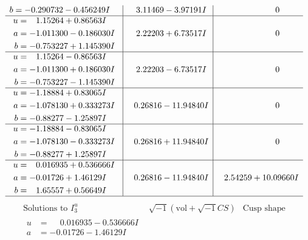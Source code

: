 \documentclass[1p]{elsarticle_modified}
\theoremstyle{definition}
\newcommand{\I}{\sqrt{-1}}
\begin{document}
$$\begin{array}{c|c|c}
\begin{aligned}
b &= -0.290732 - 0.456249 I\end{aligned}
 & \phantom{-}3.11469 - 3.97191 I & \phantom{-0.000000 } 0 \\ \hline\begin{aligned}
u &= \phantom{-}1.15264 + 0.86563 I \\
a &= -1.011300 - 0.186030 I \\
b &= -0.753227 + 1.145390 I\end{aligned}
 & \phantom{-}2.22203 + 6.73517 I & \phantom{-0.000000 } 0 \\ \hline\begin{aligned}
u &= \phantom{-}1.15264 - 0.86563 I \\
a &= -1.011300 + 0.186030 I \\
b &= -0.753227 - 1.145390 I\end{aligned}
 & \phantom{-}2.22203 - 6.73517 I & \phantom{-0.000000 } 0 \\ \hline\begin{aligned}
u &= -1.18884 + 0.83065 I \\
a &= -1.078130 + 0.333273 I \\
b &= -0.88277 - 1.25897 I\end{aligned}
 & \phantom{-}0.26816 - 11.94840 I & \phantom{-0.000000 } 0 \\ \hline\begin{aligned}
u &= -1.18884 - 0.83065 I \\
a &= -1.078130 - 0.333273 I \\
b &= -0.88277 + 1.25897 I\end{aligned}
 & \phantom{-}0.26816 + 11.94840 I & \phantom{-0.000000 } 0 \\ \hline\begin{aligned}
u &= \phantom{-}0.016935 + 0.536666 I \\
a &= -0.01726 + 1.46129 I \\
b &= \phantom{-}1.65557 + 0.56649 I\end{aligned}
 & \phantom{-}0.26816 - 11.94840 I & \phantom{-}2.54259 + 10.09660 I\\
 \hline 
 \end{array}$$\newpage$$\begin{array}{c|c|c}  
\text{Solutions to }I^u_{3}& \I (\text{vol} + \sqrt{-1}CS) & \text{Cusp shape}\\
 \hline 
\begin{aligned}
u &= \phantom{-}0.016935 - 0.536666 I \\
a &= -0.01726 - 1.46129 I \\

\end{aligned}
\end{array}$$
\end{document}
